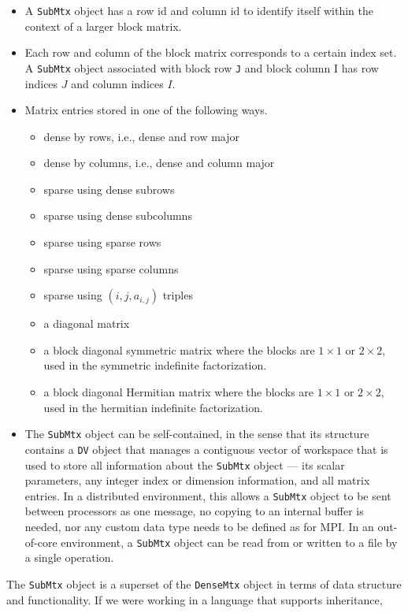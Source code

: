 \begin{itemize}
\item
A {\tt SubMtx} object has a row id and column id to identify itself
within the context of a larger block matrix.
\item
Each row and column of the block matrix corresponds 
to a certain index set.
A {\tt SubMtx} object associated with block row {\tt J} 
and block column {I} has row indices $J$ and column indices $I$.
\item
Matrix entries stored in one of the following ways.
\begin{itemize}
\item dense by rows, i.e., dense and row major
\item dense by columns, i.e., dense and column major
\item sparse using dense subrows
\item sparse using dense subcolumns
\item sparse using sparse rows
\item sparse using sparse columns
\item sparse using $(i,j,a_{i,j})$ triples
\item a diagonal matrix
\item a block diagonal symmetric matrix where the blocks are 
      $1 \times 1$ or $2 \times 2$, used in the symmetric
      indefinite factorization.
\item a block diagonal Hermitian matrix where the blocks are 
      $1 \times 1$ or $2 \times 2$, used in the hermitian
      indefinite factorization.
\end{itemize}
\item
The {\tt SubMtx} object can be self-contained, in the sense that
its structure contains a {\tt DV} object that manages a contiguous
vector of workspace that is used to store all information about the
{\tt SubMtx} object --- its scalar parameters, any integer index
or dimension information, and all matrix entries.
In a distributed environment, 
this allows a {\tt SubMtx} object to be sent between processors
as one message, no copying to an internal buffer is needed,
nor any custom data type needs to be defined as for MPI.
In an out-of-core environment,
a {\tt SubMtx} object can be read from or written to a file 
by a single operation.
\end{itemize}
\par
The {\tt SubMtx} object is a superset of the {\tt DenseMtx} object
in terms of data structure and functionality.
If we were working in a language that supports inheritance,
